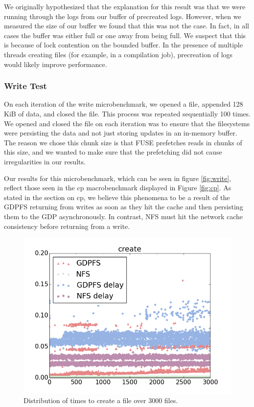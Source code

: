 \documentclass{acm_proc_article-sp}
\begin{document}
We originally hypothesized that the explanation for this result was that we were running through the logs from our buffer of precreated logs. However, when we measured the size of our buffer we found that this was not the case. In fact, in all cases the buffer was either full or one away from being full. We suspect that this is because of lock contention on the bounded buffer. In the presence of multiple threads creating files (for example, in a compilation job), precreation of logs would likely improve performance.

\subsubsection{Write Test}
On each iteration of the write microbenchmark, we opened a file, appended 128 KiB of data, and closed the file. This process was repeated sequentially 100 times. We opened and closed the file on each iteration was to ensure that the filesystems were persisting the data and not just storing updates in an in-memory buffer. The reason we chose this chunk size is that FUSE prefetches reads in chunks of this size, and we wanted to make sure that the prefetching did not cause irregularities in our results.

Our results for this microbenchmark, which can be seen in figure \ref{fig:write}, reflect those seen in the cp macrobenchmark displayed in Figure \ref{fig:cp}. As stated in the section on cp, we believe this phenomena to be a result of the GDPFS returning from writes as soon as they hit the cache and then persisting them to the GDP asynchronously. In contrast, NFS must hit the network cache consistency before returning from a write.

\begin{figure}[t]
\centering
\includegraphics[width=.8\columnwidth]{create}
\caption{Distribution of times to create a file over 3000 files.\label{fig:create}}
\end{figure} 
\end{document}
